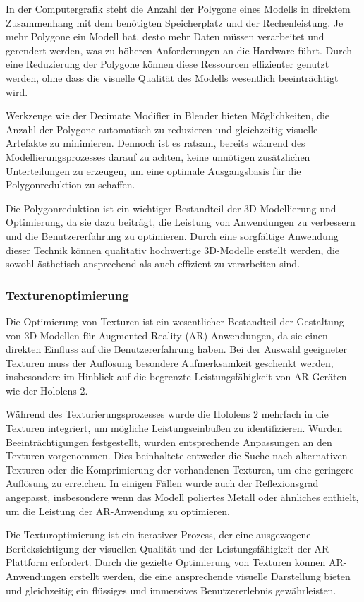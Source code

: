 In der Computergrafik steht die Anzahl der Polygone eines Modells in direktem Zusammenhang mit dem benötigten Speicherplatz
und der Rechenleistung. Je mehr Polygone ein Modell hat, desto mehr Daten müssen verarbeitet und gerendert werden, was
zu höheren Anforderungen an die Hardware führt. Durch eine Reduzierung der Polygone können diese Ressourcen effizienter
genutzt werden, ohne dass die visuelle Qualität des Modells wesentlich beeinträchtigt wird.

Werkzeuge wie der Decimate Modifier in Blender bieten Möglichkeiten, die Anzahl der Polygone automatisch zu reduzieren
und gleichzeitig visuelle Artefakte zu minimieren. Dennoch ist es ratsam, bereits während des Modellierungsprozesses
darauf zu achten, keine unnötigen zusätzlichen Unterteilungen zu erzeugen, um eine optimale Ausgangsbasis für die
Polygonreduktion zu schaffen.

Die Polygonreduktion ist ein wichtiger Bestandteil der 3D-Modellierung und -Optimierung, da sie dazu beiträgt, die Leistung
von Anwendungen zu verbessern und die Benutzererfahrung zu optimieren. Durch eine sorgfältige Anwendung dieser Technik
können qualitativ hochwertige 3D-Modelle erstellt werden, die sowohl ästhetisch ansprechend als auch effizient zu verarbeiten
sind.

\subsubsection{Texturenoptimierung}
Die Optimierung von Texturen ist ein wesentlicher Bestandteil der Gestaltung von 3D-Modellen für Augmented Reality
(AR)-Anwendungen, da sie einen direkten Einfluss auf die Benutzererfahrung haben. Bei der Auswahl geeigneter Texturen
muss der Auflösung besondere Aufmerksamkeit geschenkt werden, insbesondere im Hinblick auf die begrenzte Leistungsfähigkeit
von AR-Geräten wie der Hololens 2.

Während des Texturierungsprozesses wurde die Hololens 2 mehrfach in die Texturen integriert, um mögliche Leistungseinbußen
zu identifizieren. Wurden Beeinträchtigungen festgestellt, wurden entsprechende Anpassungen an den Texturen vorgenommen.
Dies beinhaltete entweder die Suche nach alternativen Texturen oder die Komprimierung der vorhandenen Texturen, um eine
geringere Auflösung zu erreichen. In einigen Fällen wurde auch der Reflexionsgrad angepasst, insbesondere wenn das Modell
poliertes Metall oder ähnliches enthielt, um die Leistung der AR-Anwendung zu optimieren.

Die Texturoptimierung ist ein iterativer Prozess, der eine ausgewogene Berücksichtigung der visuellen Qualität und der
Leistungsfähigkeit der AR-Plattform erfordert. Durch die gezielte Optimierung von Texturen können AR-Anwendungen erstellt
werden, die eine ansprechende visuelle Darstellung bieten und gleichzeitig ein flüssiges und immersives Benutzererlebnis
gewährleisten.

